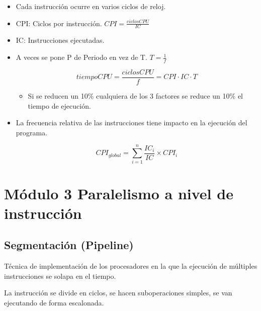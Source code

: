 \documentclass[12pt, twoside, openright]{report} %
\begin{document}
  \begin{itemize}
  
  \item
    Cada instrucción ocurre en varios ciclos de reloj.
  \item
    CPI: Ciclos por instrucción. \(CPI = \frac {ciclosCPU} {IC}\)
  \item
    IC: Instrucciones ejecutadas.
  \item A veces se pone P de Periodo en vez de T. $T=\frac 1f$
  
  $$tiempoCPU = \frac {ciclosCPU} f= CPI\cdot IC\cdot T$$ 
  
  

    \begin{itemize}
    
    \item
      Si se reducen un 10\% cualquiera de los 3 factores se reduce un
      10\% el tiempo de ejecución.
    \end{itemize}
  \item
    La frecuencia relativa de las instrucciones tiene impacto en la
    ejecución del programa.


    

    $$CPI_{global}=\sum_{i=1}^{n} \frac {IC_i} {IC} \times CPI_i$$

    \end{itemize}

  \chapter{Módulo 3 Paralelismo a nivel de instrucción}


  
  \section{Segmentación (Pipeline)}

  Técnica de implementación de los procesadores en la que la ejecución
  de múltiples instrucciones se solapa en el tiempo.

  La instrucción se divide en ciclos, se hacen suboperaciones simples,
  se van ejecutando de forma escalonada.
\end{document}
